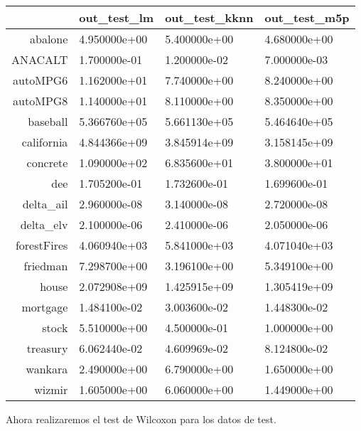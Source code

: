 \documentclass[11pt]{article}
\begin{document}
    
    \begin{tabular}{r|lll}
  & out\_test\_lm & out\_test\_kknn & out\_test\_m5p\\
\hline
	abalone & 4.950000e+00 & 5.400000e+00 & 4.680000e+00\\
	ANACALT & 1.700000e-01 & 1.200000e-02 & 7.000000e-03\\
	autoMPG6 & 1.162000e+01 & 7.740000e+00 & 8.240000e+00\\
	autoMPG8 & 1.140000e+01 & 8.110000e+00 & 8.350000e+00\\
	baseball & 5.366760e+05 & 5.661130e+05 & 5.464640e+05\\
	california & 4.844366e+09 & 3.845914e+09 & 3.158145e+09\\
	concrete & 1.090000e+02 & 6.835600e+01 & 3.800000e+01\\
	dee & 1.705200e-01 & 1.732600e-01 & 1.699600e-01\\
	delta\_ail & 2.960000e-08 & 3.140000e-08 & 2.720000e-08\\
	delta\_elv & 2.100000e-06 & 2.410000e-06 & 2.050000e-06\\
	forestFires & 4.060940e+03 & 5.841000e+03 & 4.071040e+03\\
	friedman & 7.298700e+00 & 3.196100e+00 & 5.349100e+00\\
	house & 2.072908e+09 & 1.425915e+09 & 1.305419e+09\\
	mortgage & 1.484100e-02 & 3.003600e-02 & 1.448300e-02\\
	stock & 5.510000e+00 & 4.500000e-01 & 1.000000e+00\\
	treasury & 6.062440e-02 & 4.609969e-02 & 8.124800e-02\\
	wankara & 2.490000e+00 & 6.790000e+00 & 1.650000e+00\\
	wizmir & 1.605000e+00 & 6.060000e+00 & 1.449000e+00\\
\end{tabular}


    
    Ahora realizaremos el test de Wilcoxon para los datos de test.
\end{document}

